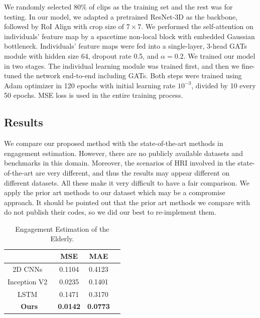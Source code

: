 \documentclass[twocolumn]{svjour3}
\begin{document}
We randomly selected 80\% of clips as the training set and the rest was for testing. In our model, we adapted a pretrained ResNet-3D as the backbone, followed by RoI Align with crop size of $7\times7$. We performed the self-attention on individuals' feature map by a spacetime non-local block with embedded Gaussian bottleneck. Individuals' feature maps were fed into a single-layer, 3-head GATs module with hidden size 64, dropout rate 0.5, and $\alpha = 0.2$. We trained our model in two stages. The individual learning module was trained first, and then we fine-tuned the network end-to-end including GATs. Both steps were trained using Adam optimizer in 120 epochs with initial learning rate $10^{-3}$, divided by 10 every 50 epochs. MSE loss is used in the entire training process.

\subsection{Results}
\label{subs:Main_Results}

We compare our proposed method with the state-of-the-art methods in engagement estimation. However, there are no publicly available datasets and benchmarks in this domain. Moreover, the scenarios of HRI involved in the state-of-the-art are very different, and thus the results may appear different on different datasets.
All these make it very difficult to have a fair comparison. We apply the prior art methods to our dataset which may be a compromise approach. It should be pointed out that the prior art methods we compare with do not publish their codes, so we did our best to re-implement them.

\begin{table}[htb]
  \centering
  \caption{Engagement Estimation of the Elderly.}
  \label{t:main_results}
  \begin{tabular}{cccc}
  \toprule
  \textbf{} & \textbf{MSE} & \textbf{MAE} \\
  \midrule
  2D CNNs~\cite{Anagnostopoulou2021Engagement} & 0.1104 & 0.4123 \\
  Inception V2~\cite{Saleh2021Improving} & 0.0235 & 0.1401 \\
  LSTM~\cite{Steinert2020Engagement} & 0.1471 & 0.3170 \\
  \midrule
  \textbf{Ours}& \textbf{0.0142} & \textbf{0.0773} \\ %
  \bottomrule
  \end{tabular}
\end{table}
\end{document}
